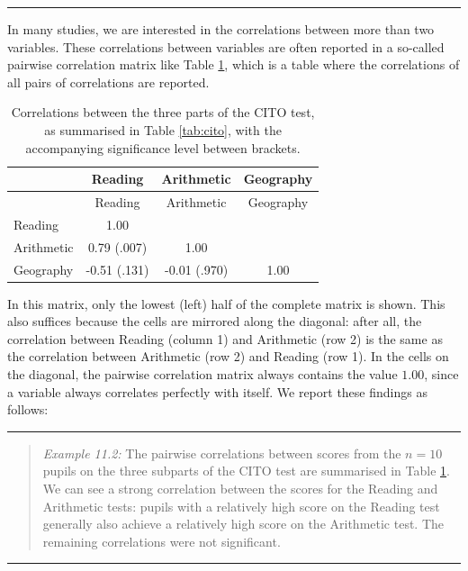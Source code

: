 \documentclass[
]{book}
\begin{document}
\begin{center}\rule{0.5\linewidth}{0.5pt}\end{center}

In many studies, we are interested in the correlations between more
than two variables. These correlations between variables are often
reported in a so-called pairwise
correlation matrix like
Table \ref{tab:cito-correlations}, which is a table where the correlations
of all pairs of correlations are reported.

\begin{longtable}[]{@{}lccc@{}}
\caption{\label{tab:cito-correlations} Correlations between the three parts of the CITO
test, as summarised in Table \ref{tab:cito}, with the accompanying significance level between brackets.}\tabularnewline
\toprule
& Reading & Arithmetic & Geography\tabularnewline
\midrule
\endfirsthead
\toprule
& Reading & Arithmetic & Geography\tabularnewline
\midrule
\endhead
Reading & 1.00 & &\tabularnewline
Arithmetic & 0.79 (.007) & 1.00 &\tabularnewline
Geography & -0.51 (.131) & -0.01 (.970) & 1.00\tabularnewline
\bottomrule
\end{longtable}

In this matrix, only the lowest (left) half of the complete
matrix is shown. This also suffices because the cells are mirrored
along the diagonal: after all, the correlation between Reading (column 1) and Arithmetic
(row 2) is the same as the correlation between Arithmetic (row 2) and
Reading (row 1). In the cells on the diagonal, the pairwise correlation matrix
always contains the value \(1.00\), since a variable always correlates perfectly with
itself.
We report these findings as follows:

\begin{center}\rule{0.5\linewidth}{0.5pt}\end{center}

\begin{quote}
\emph{Example 11.2:} The
pairwise correlations between scores from the \(n=10\) pupils on the
three subparts of the CITO test are summarised in
Table \ref{tab:cito-correlations}. We can see a strong correlation between
the scores for the Reading and Arithmetic tests: pupils with a relatively
high score on the Reading test generally also achieve a relatively high
score on the Arithmetic test. The remaining correlations were
not significant.
\end{quote}

\begin{center}\rule{0.5\linewidth}{0.5pt}\end{center}
\end{document}
